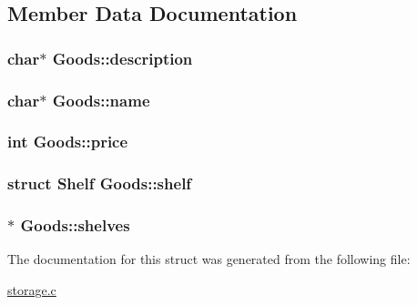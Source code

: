 \subsection{Member Data Documentation}
\hypertarget{structGoods_ae2a9c468b7d05199d18963be8c1d4ddc}{
\subsubsection[{description}]{\setlength{\rightskip}{0pt plus 5cm}char$\ast$ Goods\-::description}}\label{structGoods_ae2a9c468b7d05199d18963be8c1d4ddc}
\hypertarget{structGoods_a10a587a1c8e7f70378704662c77cc543}{
\subsubsection[{name}]{\setlength{\rightskip}{0pt plus 5cm}char$\ast$ Goods\-::name}}\label{structGoods_a10a587a1c8e7f70378704662c77cc543}
\hypertarget{structGoods_a37df40a762a8b91f5c35ca2126a3ebdd}{
\subsubsection[{price}]{\setlength{\rightskip}{0pt plus 5cm}int Goods\-::price}}\label{structGoods_a37df40a762a8b91f5c35ca2126a3ebdd}
\hypertarget{structGoods_aa81f3c106c29f524219d0696885a8e3c}{
\subsubsection[{shelf}]{\setlength{\rightskip}{0pt plus 5cm}struct {\bf Shelf} Goods\-::shelf}}\label{structGoods_aa81f3c106c29f524219d0696885a8e3c}
\hypertarget{structGoods_a19afec90a964b7d29af488df58c03fae}{
\subsubsection[{shelves}]{$\ast$ Goods\-::shelves}}\label{structGoods_a19afec90a964b7d29af488df58c03fae}


The documentation for this struct was generated from the following file\-:\begin{DoxyCompactItemize}
\item 
\hyperlink{storage_8c}{storage.\-c}\end{DoxyCompactItemize}
